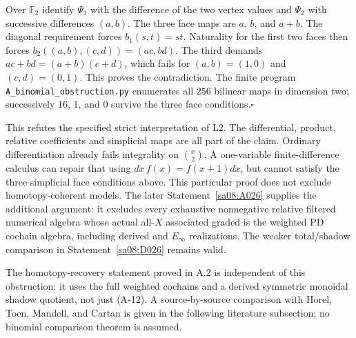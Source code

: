 Over $\mathbb F_2$ identify $\Psi_1$ with the difference of the
two vertex values and $\Psi_2$ with successive differences $(a,b)$.
The three face maps are $a$, $b$, and $a+b$. The diagonal requirement
forces $b_1(s,t)=st$. Naturality for the first two faces then forces
$b_2((a,b),(c,d))=(ac,bd)$. The third demands
$ac+bd=(a+b)(c+d)$, which fails for $(a,b)=(1,0)$ and
$(c,d)=(0,1)$. This proves the contradiction. The finite program
\texttt{A\_binomial\_obstruction.py} enumerates all $256$ bilinear
maps in dimension two; successively $16$, $1$, and $0$ survive
the three face conditions.\hfill$\square$

This refutes the specified strict interpretation of L2. The differential,
product, relative coefficients and simplicial maps are all part of the
claim. Ordinary differentiation already fails integrality
on $\binom x2$. A one-variable finite-difference calculus can repair
that using $dx\,f(x)=f(x+1)dx$, but cannot satisfy the three simplicial
face conditions above. This particular proof does not exclude
homotopy-coherent models. The later Statement~\ref{sa08:A026}
supplies the additional argument: it excludes every exhaustive
nonnegative relative filtered numerical algebra whose actual all-$X$
associated graded is the weighted PD cochain algebra, including
derived and $E_\infty$ realizations. The weaker total/shadow
comparison in Statement~\ref{sa08:D026} remains valid.

The homotopy-recovery statement proved in A.2 is independent
of this obstruction: it uses the full weighted cochains and a derived
symmetric monoidal shadow quotient, not just (A-12). A source-by-source
comparison with Horel, Toen, Mandell, and Cartan is given
in the following literature subsection; no binomial comparison theorem is assumed.

